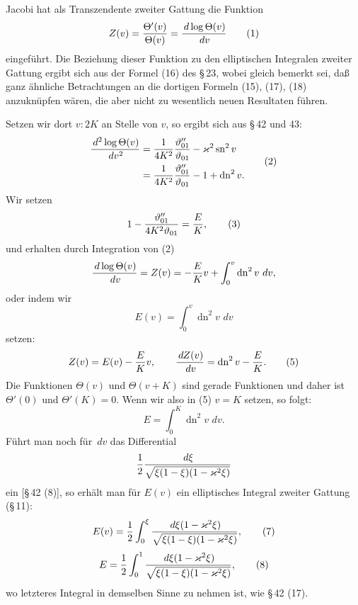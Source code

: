 \documentclass[11pt]{article}
\providecommand{\dd}{\,d}
\providecommand{\tht}{\vartheta}
\providecommand{\sn}{\operatorname{sn}}
\providecommand{\dn}{\operatorname{dn}}
\begin{document}
Jacobi hat als Transzendente zweiter Gattung die Funktion
\begin{equation}
Z(v)={\Theta'(v)\over\Theta(v)}={\dd\log\Theta(v)\over\dd v}
\tag{1}
\end{equation}
eingeführt. Die Beziehung dieser Funktion zu den elliptischen Integralen zweiter Gattung ergibt sich aus der Formel (16) des \S\,23, wobei gleich bemerkt sei, daß ganz ähnliche Betrachtungen an die dortigen Formeln (15), (17), (18) anzuknüpfen wären, die aber nicht zu wesentlich neuen Resultaten führen.

Setzen wir dort $v:2K$ an Stelle von $v$, so ergibt sich aus \S\,42 und 43:
\begin{equation}
\begin{aligned}
{\dd^2\log\Theta(v)\over\dd v^2}
&={1\over4K^2}{\tht_{01}''\over\tht_{01}}-\varkappa^2\sn^2v\\
&={1\over4K^2}{\tht_{01}''\over\tht_{01}}-1+\dn^2v.
\end{aligned}
\tag{2}
\end{equation}
Wir setzen
\begin{equation}
1-{\tht_{01}''\over4K^2\tht_{01}}={E\over K},
\tag{3}
\end{equation}
und erhalten durch Integration von (2)
\[
{\dd\log\Theta(v)\over\dd v}=Z(v)=-{E\over K}v+\int_0^v\dn^2v\,\dd v,
\]
oder indem wir
\begin{equation}
E(v)=\int_0^v\dn^2v\,\dd v
\tag{4}
\end{equation}
setzen:
\begin{equation}
Z(v)=E(v)-{E\over K}v,
\qquad
{\dd Z(v)\over\dd v}=\dn^2v-{E\over K}.
\tag{5}
\end{equation}
Die Funktionen $\Theta(v)$ und $\Theta(v+K)$ sind gerade Funktionen und daher ist $\Theta'(0)$ und $\Theta'(K)=0$. Wenn wir also in (5) $v=K$ setzen, so folgt:
\begin{equation}
E=\int_0^K\dn^2v\,\dd v.
\tag{6}
\end{equation}
Führt man noch für $\dd v$ das Differential
\[
{1\over2}{\dd\xi\over\sqrt{\xi(1-\xi)(1-\varkappa^2\xi)}}
\]
ein [\S\,42 (8)], so erhält man für $E(v)$ ein elliptisches Integral zweiter Gattung (\S\,11):
\begin{equation}
E(v)={1\over2}\int_0^{\xi}{\dd\xi(1-\varkappa^2\xi)\over\sqrt{\xi(1-\xi)(1-\varkappa^2\xi)}},
\tag{7}
\end{equation}
\begin{equation}
E={1\over2}\int_0^{1}{\dd\xi(1-\varkappa^2\xi)\over\sqrt{\xi(1-\xi)(1-\varkappa^2\xi)}},
\tag{8}
\end{equation}
wo letzteres Integral in demselben Sinne zu nehmen ist, wie \S\,42 (17).
\end{document}
